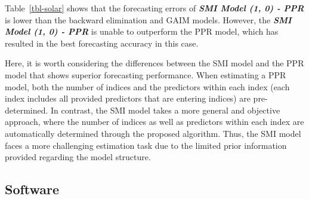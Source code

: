 \documentclass[
  11pt,
  a4paper,
]{article}
\begin{document}
\begin{table}

\caption{\label{tbl-solar}Daily solar intensity forecasting -
Out-of-sample point forecast results.}


\end{table}%

Table~\ref{tbl-solar} shows that the forecasting errors of
\textbf{\emph{SMI Model (1, 0) - PPR}} is lower than the backward
elimination and GAIM models. However, the \textbf{\emph{SMI Model (1, 0)
- PPR}} is unable to outperform the PPR model, which has resulted in the
best forecasting accuracy in this case.

Here, it is worth considering the differences between the SMI model and
the PPR model that shows superior forecasting performance. When
estimating a PPR model, both the number of indices and the predictors
within each index (each index includes all provided predictors that are
entering indices) are pre-determined. In contrast, the SMI model takes a
more general and objective approach, where the number of indices as well
as predictors within each index are automatically determined through the
proposed algorithm. Thus, the SMI model faces a more challenging
estimation task due to the limited prior information provided regarding
the model structure.

\subsection{Software}\label{software}
\end{document}
